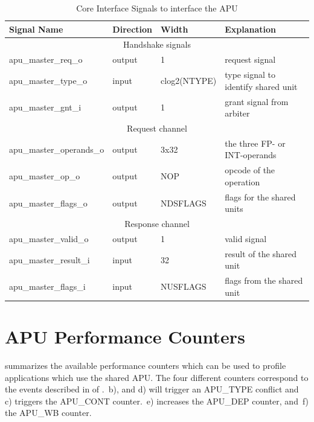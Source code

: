 \documentclass[%
 oneside,      %
 openany,      %
 halfparskip,  %
]{scrbook}
\begin{document}
\begin{table}[t]\footnotesize
\begin{threeparttable}
\renewcommand\arraystretch{0.5}
\caption{Core Interface Signals to interface the APU}
\centering
\label{tab_core_interface}
\begin{tabularx}{\textwidth}{@{}l|p{2cm}|p{2.3cm}|p{6cm}@{}}
\toprule
\textbf{Signal Name} & \textbf{Direction} & \textbf{Width} & \textbf{Explanation}\\
\midrule
\multicolumn{4}{c}{Handshake signals}\\
\midrule
apu\_master\_req\_o & output & 1             & request signal \\
apu\_master\_type\_o & input & clog2(NTYPE)  & type signal to identify shared unit\\
apu\_master\_gnt\_i & output & 1             & grant signal from arbiter\\
\midrule
\multicolumn{4}{c}{Request channel}\\
\midrule
apu\_master\_operands\_o & output            & 3x32 & the three FP- or INT-operands\\
apu\_master\_op\_o & output & NOP            & opcode of the operation\\
apu\_master\_flags\_o & output & NDSFLAGS    & flags for the shared units\\
\midrule
\multicolumn{4}{c}{Response channel}\\
\midrule
apu\_master\_valid\_o & output & 1           & valid signal\\
apu\_master\_result\_i & input & 32          & result of the shared unit\\
apu\_master\_flags\_i & input & NUSFLAGS     & flags from the shared unit\\
\bottomrule
\end{tabularx}
\end{threeparttable}
\end{table}


\section{APU Performance Counters}\label{coreperf}

 summarizes the available performance counters which can be used to profile applications which use the shared APU. The four different counters correspond to the events described in  of . \,b), and d) will trigger an APU\_TYPE conflict and \,c) triggers the APU\_CONT counter. \,e) increases the APU\_DEP counter, and \,f) the APU\_WB counter.
\end{document}
